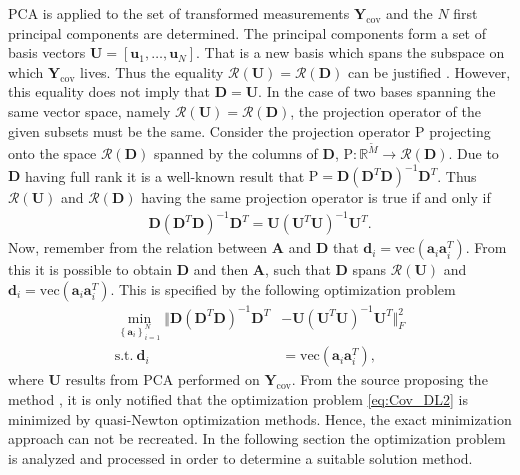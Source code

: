 PCA is applied to the set of transformed measurements $\mathbf{Y}_{\text{cov}}$ and the $N$ first principal components are determined. 
The principal components form a set of basis vectors $\mathbf{U} = [\mathbf{u}_1, \dots, \mathbf{u}_N]$. 
That is a new basis which spans the subspace on which $\mathbf{Y}_{\text{cov}}$ lives. 
Thus the equality $\mathcal{R}(\mathbf{U}) = \mathcal{R}(\mathbf{D})$ can be justified \cite{Balkan2015}. 
However, this equality does not imply that $\mathbf{D} = \mathbf{U}$. 
In the case of two bases spanning the same vector space, namely $\mathcal{R}(\mathbf{U}) = \mathcal{R}(\mathbf{D})$, the projection operator of the given subsets must be the same. 
Consider the projection operator $\text{P}$ projecting onto the space $\mathcal{R}(\mathbf{D})$ spanned by the columns of $\mathbf{D}$, $\text{P}:\mathbb{R}^{\widetilde{M}}\rightarrow \mathcal{R}(\mathbf{D})$. 
Due to $\mathbf{D}$ having full rank it is a well-known result that $\text{P} = \mathbf{D}(\mathbf{D}^T \mathbf{D})^{-1} \mathbf{D}^T$. 
Thus $\mathcal{R}(\mathbf{U})$ and $\mathcal{R}(\mathbf{D})$ having the same projection operator is true if and only if 
\begin{align*}
\mathbf{D} (\mathbf{D}^T\mathbf{D})^{-1} \mathbf{D}^T = \mathbf{U}(\mathbf{U}^T \mathbf{U})^{-1} \mathbf{U}^T.
\end{align*}
Now, remember from the relation between $\mathbf{A}$ and $\mathbf{D}$ that $\mathbf{d}_i = \text{vec}(\mathbf{a}_i \mathbf{a}_i^T)$. 
From this it is possible to obtain $\mathbf{D}$ and then $\mathbf{A}$, such that $\mathbf{D}$ spans $\mathcal{R}(\mathbf{U})$ and $\mathbf{d}_i = \text{vec}(\mathbf{a}_i \mathbf{a}_i^T)$. 
This is specified by the following optimization problem \cite{Balkan2015}
\begin{align}
\min_{\left\{\mathbf{a}_i\right\}_{i = 1}^{N}}\Vert  \mathbf{D}(\mathbf{D}^T \mathbf{D})^{-1} \mathbf{D}^T &- \mathbf{U}(\mathbf{U}^T \mathbf{U})^{-1}\mathbf{U}^T \Vert_{F}^{2} \nonumber \\
\text{s.t.} \ \mathbf{d}_i &= \text{vec}(\mathbf{a}_i \mathbf{a}_i^T),\label{eq:Cov_DL2}
\end{align}      
where $\mathbf{U}$ results from PCA performed on $\mathbf{Y}_{\text{cov}}$.
From the source proposing the method \cite{Balkan2015}, it is only notified that the optimization problem \eqref{eq:Cov_DL2} is minimized by quasi-Newton optimization methods. Hence, the exact minimization approach can not be recreated. 
In the following section the optimization problem is analyzed and processed in order to determine a suitable solution method. 
 
